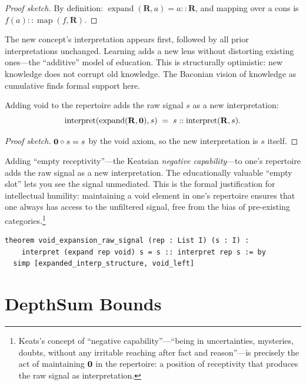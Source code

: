 \begin{proof}[Proof sketch]
By definition: $\operatorname{expand}(\mathbf{R}, a) = a :: \mathbf{R}$,
and mapping over a cons is $f(a) :: \operatorname{map}(f, \mathbf{R})$.
\end{proof}

The new concept's interpretation appears first, followed by all prior
interpretations unchanged.  Learning adds a new lens without distorting
existing ones---the ``additive'' model of education.  This is structurally
optimistic: new knowledge does not corrupt old knowledge.  The Baconian
vision of knowledge as cumulative finds formal support here.

\begin{theorem}
\label{thm:void-expansion}
Adding void to the repertoire adds the raw signal $s$ as a new interpretation:
\[
  \operatorname{interpret}(\operatorname{expand}(\mathbf{R}, \mathbf{0}), s)
  \;=\;
  s :: \operatorname{interpret}(\mathbf{R}, s).
\]
\end{theorem}

\begin{proof}[Proof sketch]
$\mathbf{0} \circ s = s$ by the void axiom, so the new interpretation is $s$
itself.
\end{proof}

Adding ``empty receptivity''---the Keatsian \emph{negative capability}---to
one's repertoire adds the raw signal as a new interpretation.  The
educationally valuable ``empty slot'' lets you see the signal unmediated.
This is the formal justification for intellectual humility: maintaining a
void element in one's repertoire ensures that one always has access to the
unfiltered signal, free from the bias of pre-existing categories.\footnote{Keats's
concept of ``negative capability''---``being in uncertainties, mysteries,
doubts, without any irritable reaching after fact and reason''---is
precisely the act of maintaining $\mathbf{0}$ in the repertoire: a position of
receptivity that produces the raw signal as interpretation.}

\begin{lstlisting}[caption={Void expansion raw signal in Lean~4}]
theorem void_expansion_raw_signal (rep : List I) (s : I) :
    interpret (expand rep void) s = s :: interpret rep s := by
  simp [expanded_interp_structure, void_left]
\end{lstlisting}

\section{DepthSum Bounds}
\label{sec:ch15-depthsum}

